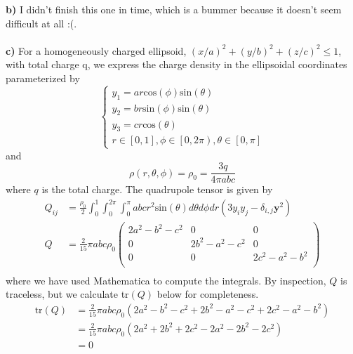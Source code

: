 \documentclass[]{book}
\begin{document}
\textbf{b)} I didn't finish this one in time, which is a bummer because it doesn't seem difficult at all :(.
\\
\\
\textbf{c)} For a homogeneously charged ellipsoid, $(x/a)^2 + (y/b)^2 +(z/c)^2 \leq 1$, with total charge q, we express the charge density in the ellipsoidal coordinates parameterized by
\begin{equation}
\begin{cases}
y_1 = ar\text{cos}(\phi) \text{sin}(\theta) \\
y_2 = br\text{sin}(\phi) \text{sin}(\theta) \\
y_3 = c r \text{cos}(\theta) \\
r\in\left[0,1 \right], \phi\in\left[0,2\pi \right), \theta\in\left[0,\pi \right]
\end{cases}
\end{equation}
and
\begin{equation}
\rho(r,\theta,\phi) = \rho_0 = \frac{3q}{4\pi abc}
\end{equation}
where $q$ is the total charge. The quadrupole tensor is given by
\begin{equation}
\begin{split}
Q_{ij} & = \frac{\rho_0}{2} \int_{0}^{1}\int_{0}^{2\pi}\int_{0}^{\pi} abcr^2\text{sin}(\theta)d\theta d\phi dr \left(3y_iy_j -\delta_{i,j}\textbf{y}^2\right) \\
Q & = 
\frac{2}{15} \pi  a b c \rho_0 \left(
\begin{array}{ccc}
   2
   a^2-b^2-c^2 & 0 & 0 \\
 0 &  2 b^2-a^2-c^2 & 0 \\
 0 & 0 &  
   2 c^2 -a^2-b^2\\
\end{array}
\right)\\
\end{split}
\end{equation}
where we have used Mathematica to compute the integrals. By inspection, $Q$ is traceless, but we calculate tr$(Q)$ below for completeness.
\begin{equation}
\begin{split}
\text{tr}(Q) & = \frac{2}{15} \pi  a b c \rho_0 \left( 2a^2 -b^2 -c^2 +2b^2 -a^2 -c^2 +2c^2 -a^2 -b^2 \right)\\
& = \frac{2}{15} \pi  a b c \rho_0 \left( 2a^2 +2b^2 +2c^2  - 2a^2  -2b^2  - 2c^2\right)\\
& = 0
\end{split}
\end{equation}
\end{document}
